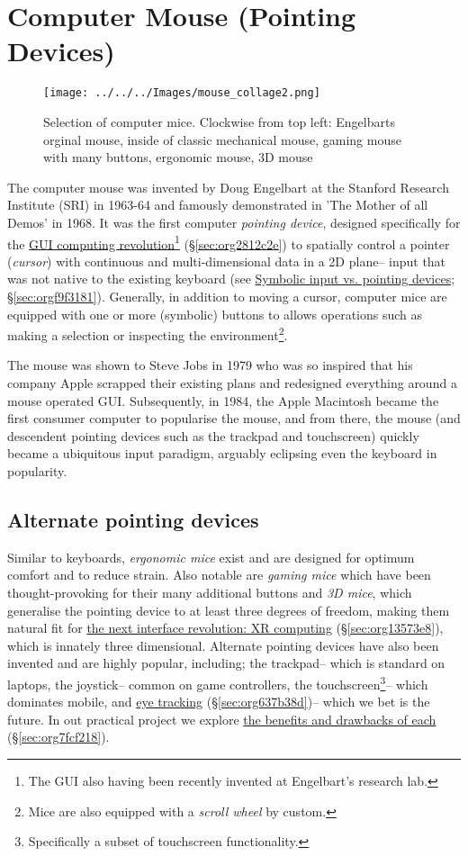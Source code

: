 \documentclass[logo,bsc,singlespacing,parskip]{infthesis}
\begin{document}
\chapter{Computer Mouse (Pointing Devices)}
\label{sec:orgc219d7f}
\begin{figure}[h]
\centering
\texttt{[image: ../../../Images/mouse\_collage2.png]}
\caption[Computer mouse collage]{Selection of computer mice. Clockwise from top left: Engelbarts orginal mouse, inside of classic mechanical mouse, gaming mouse with many buttons, ergonomic mouse, 3D mouse}
\end{figure}
The computer mouse was invented by Doug Engelbart at the Stanford Research Institute (SRI) in 1963-64 and famously demonstrated in 'The Mother of all Demos' in 1968.
It was the first computer \emph{pointing device}, designed specifically for the \hyperref[sec:org2812c2e]{GUI computing revolution}\footnote{The GUI also having been recently invented at Engelbart's research lab.} (\S \ref{sec:org2812c2e}) to spatially control a pointer (\emph{cursor}) with continuous and multi-dimensional data in a 2D plane-- input that was not native to the existing keyboard (see \hyperref[sec:orgf9f3181]{Symbolic input vs. pointing  devices}; \S \ref{sec:orgf9f3181}).
Generally, in addition to moving a cursor, computer mice are equipped with one or more (symbolic) buttons to allows operations such as making a selection or inspecting the environment\footnote{Mice are also equipped with a \emph{scroll wheel} by custom.}.

The mouse was shown to Steve Jobs in 1979 who was so inspired that his company Apple scrapped their existing plans and redesigned everything around a mouse operated GUI.
Subsequently, in 1984, the Apple Macintosh became the first consumer computer to popularise the mouse, and from there, the mouse (and descendent pointing devices such as the trackpad and touchscreen) quickly became a ubiquitous input paradigm, arguably eclipsing even the keyboard in popularity.

\section{Alternate pointing devices}
\label{sec:orgb372ef1}
Similar to keyboards, \emph{ergonomic mice} exist and are designed for optimum comfort and to reduce strain.
Also notable are \emph{gaming mice} which have been thought-provoking for their many additional buttons and \emph{3D mice}, which generalise the pointing device to at least three degrees of freedom, making them natural fit for \hyperref[sec:org13573e8]{the next interface revolution: XR computing} (\S  \ref{sec:org13573e8}), which is innately three dimensional.
Alternate pointing devices have also been invented and are highly popular, including; the trackpad-- which is standard on laptops, the joystick-- common on game controllers, the touchscreen\footnote{Specifically a subset of touchscreen functionality.}-- which dominates mobile, and \hyperref[sec:org637b38d]{eye tracking} (\S \ref{sec:org637b38d})-- which we bet is the future.
In out practical project we explore \hyperref[sec:org7fcf218]{the benefits and drawbacks of each} (\S \ref{sec:org7fcf218}).
\end{document}
